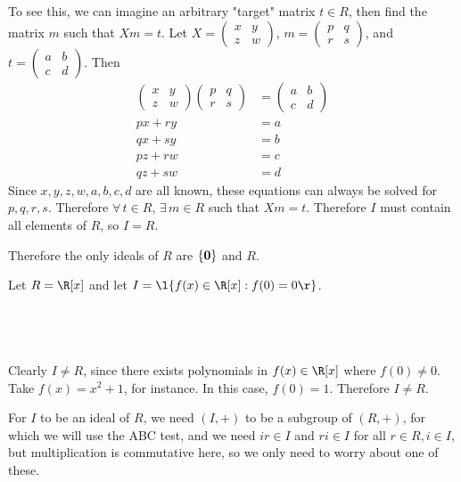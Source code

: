 \documentclass[a4paper]{article}
\begin{document}
To see this, we can imagine an arbitrary "target" matrix $t \in R$, then find the matrix $m$ such that $Xm = t$. Let $X = \begin{pmatrix}x & y\\ z & w\end{pmatrix}$, $m = \begin{pmatrix}p & q\\ r & s\end{pmatrix}$, and $t = \begin{pmatrix}a & b\\ c & d\end{pmatrix}$. Then \begin{align*}
	\begin{pmatrix}x & y\\ z & w\end{pmatrix} \begin{pmatrix}p & q\\ r & s\end{pmatrix} &= \begin{pmatrix}a & b\\ c & d\end{pmatrix}\\[1ex]
	px + ry &= a\\
	qx + sy &= b\\
	pz + rw &= c\\
	qz + sw &= d
\end{align*}
Since $x, y, z, w, a, b, c, d$ are all known, these equations can always be solved for $p, q, r, s$. Therefore $\forall\, t \in R$, $\exists\, m \in R$ such that $Xm = t$. Therefore $I$ must contain all elements of $R$, so $I = R$.

Therefore the only ideals of $R$ are $\{ \bf 0 \}$ and $R$.


Let $R = \R[x]$ and let $I = \l\{ f(x) \in \R[x] : f(0) = 0 \r\}$.

\subsection{~}

Clearly $I \ne R$, since there exists polynomials in $f(x) \in\R[x]$ where $f(0) \ne 0$. Take $f(x) = x^2 + 1$, for instance. In this case, $f(0) = 1$. Therefore $I \ne R$.

For $I$ to be an ideal of $R$, we need $(I, +)$ to be a subgroup of $(R, +)$, for which we will use the ABC test, and we need $ir \in I$ and $ri \in I$ for all $r \in R, i \in I$, but multiplication is commutative here, so we only need to worry about one of these.
\end{document}
